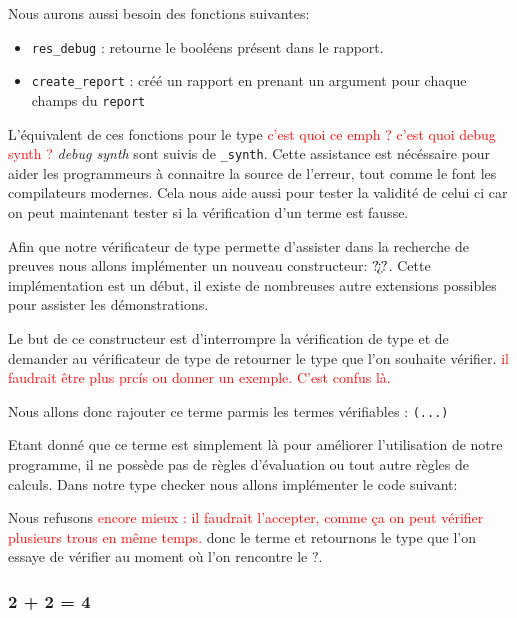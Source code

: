 \documentclass {article}
\newcommand{\codefrom}[3]
           {}
\theoremstyle{definition}
\theoremstyle{remark}
\newcommand{\todo}[1]{\textcolor{red}{#1}}
\newcommand{\fun}[1]{\lstinline!#1!}
\begin{document}
\codefrom{dependent}{lambda}{debug}

Nous aurons aussi besoin des fonctions suivantes:
\begin{itemize} 
\item \fun{res_debug} : retourne le booléens présent dans le rapport.    
\item \fun{create_report} : créé un rapport en prenant un argument pour chaque champs du \fun{report}
\end{itemize}
L'équivalent de ces fonctions pour le type \todo{c'est quoi ce emph ? c'est quoi debug synth ?} \emph{debug synth} sont suivis de \fun{_synth}.
Cette assistance est nécéssaire pour aider les programmeurs à connaitre la source de l'erreur,
tout comme le font les compilateurs modernes. Cela nous aide aussi pour tester la validité de celui 
ci car on peut maintenant tester si la vérification d'un terme est fausse.

\newcommand{\Hole}{\text{?\!?`\!?}}

Afin que notre vérificateur de type permette d'assister dans la recherche de preuves
nous allons implémenter un nouveau constructeur: $\Hole$.
Cette implémentation est un début, il existe de nombreuses autre extensions possibles
pour assister les démonstrations.

Le but de ce constructeur est d'interrompre la vérification de type et de demander au vérificateur de type de
retourner le type que l'on souhaite vérifier. \todo{il faudrait être plus prcís ou donner un exemple. C'est confus là.} %

Nous allons donc rajouter ce terme parmis les termes vérifiables :
\codefrom{dependent}{lambda}{inTm_head} \lstinline!(...)!
\codefrom{dependent}{lambda}{what}

Etant donné que ce terme est simplement là pour améliorer l'utilisation de notre programme,
il ne possède pas de règles d'évaluation ou tout autre règles de calculs.
Dans notre type checker nous allons implémenter le code suivant:

\codefrom{dependent}{lambda}{check_what}

Nous refusons \todo{encore mieux : il faudrait l'accepter, comme ça on peut vérifier plusieurs trous en même temps.} donc le terme et retournons le type que l'on essaye de vérifier au moment
où l'on rencontre le $?$.

\subsubsection{2 + 2 = 4}
\end{document}
